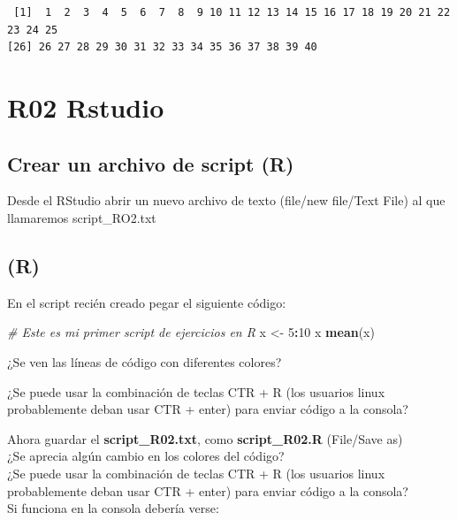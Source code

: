 \documentclass[]{book}
\newenvironment{Shaded}{\begin{snugshade}}{\end{snugshade}}
\newcommand{\CommentTok}[1]{\textcolor[rgb]{0.56,0.35,0.01}{\textit{#1}}}
\newcommand{\DecValTok}[1]{\textcolor[rgb]{0.00,0.00,0.81}{#1}}
\newcommand{\KeywordTok}[1]{\textcolor[rgb]{0.13,0.29,0.53}{\textbf{#1}}}
\newcommand{\NormalTok}[1]{#1}
\newcommand{\OperatorTok}[1]{\textcolor[rgb]{0.81,0.36,0.00}{\textbf{#1}}}
\newcommand{\StringTok}[1]{\textcolor[rgb]{0.31,0.60,0.02}{#1}}
\begin{document}
\begin{verbatim}
 [1]  1  2  3  4  5  6  7  8  9 10 11 12 13 14 15 16 17 18 19 20 21 22 23 24 25
[26] 26 27 28 29 30 31 32 33 34 35 36 37 38 39 40
\end{verbatim}

\hypertarget{r02-rstudio}{%
\chapter*{R02 Rstudio}\label{r02-rstudio}}

\hypertarget{crear-un-archivo-de-script-r}{%
\section{Crear un archivo de script (R)}\label{crear-un-archivo-de-script-r}}

Desde el RStudio abrir un nuevo archivo de texto (file/new file/Text File) al que llamaremos script\_RO2.{txt}

\hypertarget{r}{%
\section{(R)}\label{r}}

En el script recién creado pegar el siguiente código:

\begin{Shaded}
\begin{Highlighting}[]
\CommentTok{# Este es mi primer script de ejercicios en R}
\NormalTok{x <-}\StringTok{ }\DecValTok{5}\OperatorTok{:}\DecValTok{10}
\NormalTok{x}
\KeywordTok{mean}\NormalTok{(x)}
\end{Highlighting}
\end{Shaded}

¿Se ven las líneas de código con diferentes colores?

¿Se puede usar la combinación de teclas CTR + R (los usuarios linux probablemente deban usar CTR + enter) para enviar código a la consola?

Ahora guardar el \textbf{script\_R02.{txt}}, como \textbf{script\_R02.{R}} (File/Save as)\\
¿Se aprecia algún cambio en los colores del código?\\
¿Se puede usar la combinación de teclas CTR + R (los usuarios linux probablemente deban usar CTR + enter) para enviar código a la consola?\\
Si funciona en la consola debería verse:
\end{document}
